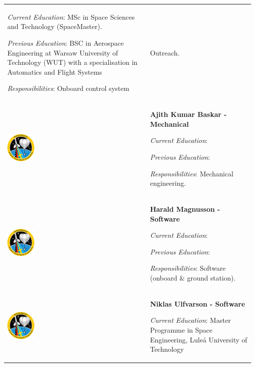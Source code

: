 \begin{longtable}[]{m{} m{}}
\smallskip
\textit{Current Education}: MSc in Space Sciences and Technology (SpaceMaster).

\smallskip
\textit{Previous Education}: BSC in Aerospace Engineering at Warsaw University of Technology (WUT) with a specialisation in Automatics and Flight Systems

\smallskip
\textit{Responsibilities}: Onboard control system & Outreach.
\bigskip
\\

\includegraphics[width=0.2\textwidth]{0-cover/img/logo-rexus-bexus.png}  & \textbf{Ajith Kumar Baskar - Mechanical}

\smallskip
\textit{Current Education}:

\smallskip
\textit{Previous Education}:

\smallskip
\textit{Responsibilities}: Mechanical engineering.
\bigskip
\\

\includegraphics[width=0.2\textwidth]{0-cover/img/logo-rexus-bexus.png}  & \textbf{Harald Magnusson - Software}

\smallskip
\textit{Current Education}:

\smallskip
\textit{Previous Education}:

\smallskip
\textit{Responsibilities}: Software (onboard \& ground station).
\bigskip
\\

\includegraphics[width=0.2\textwidth]{0-cover/img/logo-rexus-bexus.png}  & \textbf{Niklas Ulfvarson - Software}

\smallskip
\textit{Current Education}: Master Programme in Space Engineering, Luleå University of Technology


\end{longtable}
